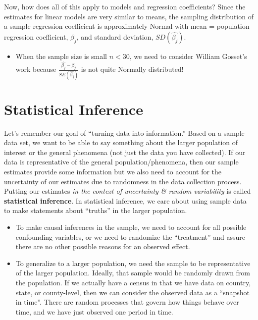 \documentclass[
]{book}
\providecommand{\tightlist}{%
  \setlength{\itemsep}{0pt}\setlength{\parskip}{0pt}}
\begin{document}
Now, how does all of this apply to models and regression coefficients? Since the estimates for linear models are very similar to means, the sampling distribution of a sample regression coefficient is approximately Normal with mean = population regression coefficient, \(\beta_j\), and standard deviation, \(SD(\hat{\beta_j})\).

\begin{itemize}
\tightlist
\item
  When the sample size is small \(n<30\), we need to consider William Gosset's work because \(\frac{\hat{\beta_j} - \beta_j}{SE(\hat{\beta_j})}\) is not quite Normally distributed!
\end{itemize}

\chapter{Statistical Inference}\label{statistical-inference}

Let's remember our goal of ``turning data into information.'' Based on a sample data set, we want to be able to say something about the larger population of interest or the general phenomena (not just the data you have collected). If our data is representative of the general population/phenomena, then our sample estimates provide some information but we also need to account for the uncertainty of our estimates due to randomness in the data collection process. Putting our estimates \emph{in the context of uncertainty \& random variability} is called \textbf{statistical inference}. In statistical inference, we care about using sample data to make statements about ``truths'' in the larger population.

\begin{itemize}
\tightlist
\item
  To make causal inferences in the sample, we need to account for all possible confounding variables, or we need to randomize the ``treatment'' and assure there are no other possible reasons for an observed effect.
\item
  To generalize to a larger population, we need the sample to be representative of the larger population. Ideally, that sample would be randomly drawn from the population. If we actually have a census in that we have data on country, state, or county-level, then we can consider the observed data as a ``snapshot in time''. There are random processes that govern how things behave over time, and we have just observed one period in time.
\end{itemize}
\end{document}
